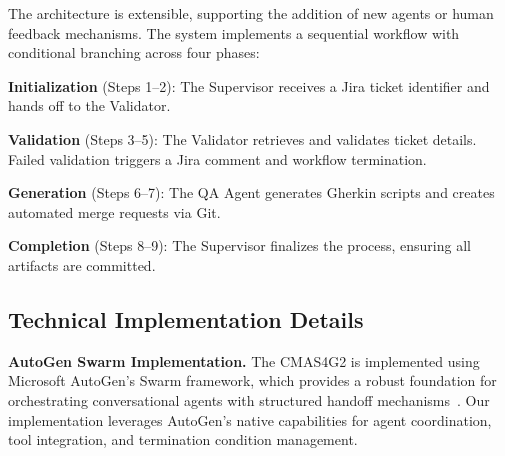\documentclass[runningheads]{llncs}
\begin{document}
The architecture is extensible, supporting the addition of new agents or human feedback mechanisms. The system implements a sequential workflow with conditional branching across four phases:

\noindent\textbf{Initialization} (Steps 1--2): The Supervisor receives a Jira ticket identifier and hands off to the Validator.

\noindent\textbf{Validation} (Steps 3--5): The Validator retrieves and validates ticket details. Failed validation triggers a Jira comment and workflow termination.

\noindent\textbf{Generation} (Steps 6--7): The QA Agent generates Gherkin scripts and creates automated merge requests via Git.

\noindent\textbf{Completion} (Steps 8--9): The Supervisor finalizes the process, ensuring all artifacts are committed.

\subsection{Technical Implementation Details}
\noindent \textbf{AutoGen Swarm Implementation.}
The CMAS4G2 is implemented using Microsoft AutoGen's Swarm framework, which provides a robust foundation for orchestrating conversational agents with structured handoff mechanisms~\cite{autogen_swarm_docs,autogen_handoffs}. Our implementation leverages AutoGen's native capabilities for agent coordination, tool integration, and termination condition management.
\end{document}
